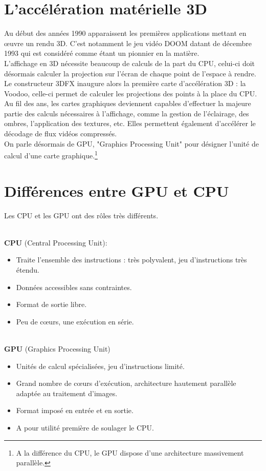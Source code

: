 \section{L'accélération matérielle 3D}
Au début des années 1990 apparaissent les premières applications mettant en œuvre un rendu 3D. C'est notamment le jeu vidéo DOOM datant de décembre 1993 qui est considéré comme étant un pionnier en la matière.\\
L'affichage en 3D nécessite beaucoup de calculs de la part du CPU, celui-ci doit désormais calculer la projection sur l'écran de chaque point de l'espace à rendre.\\
Le constructeur 3DFX inaugure alors la première carte d'accélération 3D : la Voodoo, celle-ci permet de calculer les projections des points à la place du CPU.\\
Au fil des ans, les cartes graphiques deviennent capables d'effectuer la majeure partie des calculs nécessaires à l'affichage,  comme la gestion de l'éclairage, des ombres, l'application des textures, etc. Elles permettent
également d'accélérer le décodage de flux vidéos compressés.\\
On parle désormais de GPU, "Graphics Processing Unit" pour désigner l'unité de calcul d'une carte graphique.\footnote{A la différence du CPU, le GPU dispose d'une architecture massivement parallèle.}

\section{Différences entre GPU et CPU}

Les CPU et les GPU ont des rôles très différents.

\textbf{\\CPU} (Central Processing Unit):
\begin{itemize}
	\item	Traite l'ensemble des instructions : très polyvalent, jeu d'instructions très étendu.
	\item	Données accessibles sans contraintes.
	\item	Format de sortie libre.
	\item	Peu de cœurs, une exécution en série.
\end{itemize}

\textbf{\\GPU} (Graphics Processing Unit)
\begin{itemize}
	\item	Unités de calcul spécialisées, jeu d'instructions limité.
	\item	Grand nombre de cœurs d'exécution, architecture hautement parallèle adaptée au traitement d'images.
	\item	Format imposé en entrée et en sortie.
	\item	A pour utilité première de soulager le CPU.
	\\
\end{itemize}

